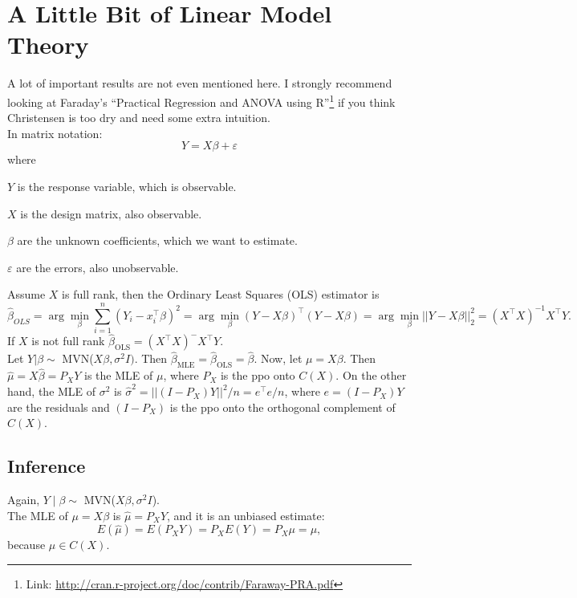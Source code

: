 \documentclass[letterpaper,11pt]{article}
\newenvironment{packed_item}{
\begin{itemize}
  \setlength{\itemsep}{1pt}
  \setlength{\parskip}{0pt}
  \setlength{\parsep}{0pt}
}{\end{itemize}}
\renewcommand{\t}{^\intercal} %
\newcommand{\1}{\mathbf{1}} %
\begin{document}
\section{A Little Bit of Linear Model Theory}

A lot of important results are not even mentioned here. I strongly
recommend looking at Faraday's ``Practical Regression and ANOVA using
R''\footnote{Link:
  \url{http://cran.r-project.org/doc/contrib/Faraway-PRA.pdf}} if
you think Christensen is too dry and need some extra intuition. \\ 


In matrix notation:
$$
Y = X\beta + \varepsilon
$$
where
\begin{packed_item}
\item $Y$ is the response variable, which is observable.
\item $X$ is the design matrix, also observable.
\item $\beta$ are the unknown coefficients, which we want to estimate.
\item $\varepsilon$ are the errors, also unobservable.
\end{packed_item}

Assume $X$ is full rank, then the Ordinary Least Squares (OLS) estimator is
$$
\hat{\beta}_{OLS} = \arg \min_\beta \sum_{i=1}^n (Y_i - x^\intercal_i
\beta)^2 =  \arg \min_\beta (Y - X\beta)^\intercal (Y - X\beta) =
\arg \min_\beta || Y - X \beta||^2_2 = (X \t X)^{-1} X \t Y.
$$
If $X$ is not full rank $\hat{\beta}_{\mathrm{OLS}} = (X \t X)^{-} X \t Y$. \\

Let $Y | \beta \sim $ MVN($X\beta, \sigma^2 I)$. Then
$\hat{\beta}_{\mathrm{MLE}} = \hat{\beta}_{\mathrm{OLS}} = \hat{\beta}$. Now, let $\mu = X\beta$. Then
$\hat{\mu} = X \hat{\beta} = P_X Y$ is the MLE of $\mu$, where $P_X$
is the ppo onto $C(X)$. On the other hand, the MLE of $\sigma^2$ is
$\hat{\sigma}^2 = ||(I-P_X)Y||^2/n = e^\intercal e/n$, where $e =
(I-P_X)Y$ are the residuals and $(I-P_X)$ is the ppo onto the
orthogonal complement of $C(X)$. 

\subsection{Inference}

Again, $Y \mid \beta \sim$ MVN($X\beta, \sigma^2I$). \\

The MLE of $\mu = X\beta$ is $\hat{\mu} = P_X Y$, and it is an unbiased estimate:
$$
E(\hat{\mu}) = E(P_X Y) = P_X E(Y) = P_X \mu = \mu,
$$ 
because $\mu \in C(X)$. \\
\end{document}
